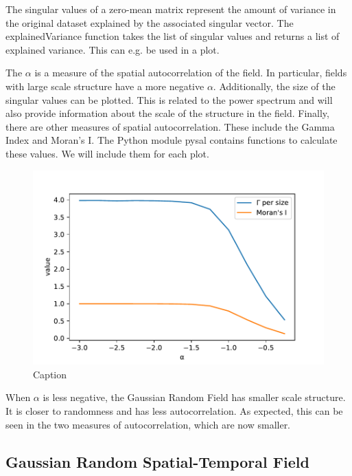 \documentclass{acm_proc_article-sp}
\begin{document}
The singular values of a zero-mean matrix represent the amount of variance in the original dataset explained by the associated singular vector. The explainedVariance function takes the list of singular values and returns a list of explained variance. This can e.g. be used in a plot. ~\cite{Moran1950} ~\cite{PySAL}

The $\alpha$ is a measure of the spatial autocorrelation of the field. In particular, fields with large scale structure have a more negative $\alpha$. Additionally, the size of the singular values can be plotted. This is related to the power spectrum and will also provide information about the scale of the structure in the field. Finally, there are other measures of spatial autocorrelation. These include the Gamma Index and Moran's I. The Python module pysal contains functions to calculate these values. We will include them for each plot.

\begin{figure}[h]
\begin{center}
\includegraphics[scale=0.5]{Results/plotGammaAndMoransI.pdf}
\caption[Small caption]{Caption}
\label{fig:plotGammaAndMoransI}
\end{center}
\end{figure}

When $\alpha$ is less negative, the Gaussian Random Field has smaller scale structure. It is closer to randomness and has less autocorrelation. As expected, this can be seen in the two measures of autocorrelation, which are now smaller.

\subsection{Gaussian Random Spatial-Temporal Field}
\label{sec:Introduction Gaussian Random Spatial-Temporal Field}
\end{document}
